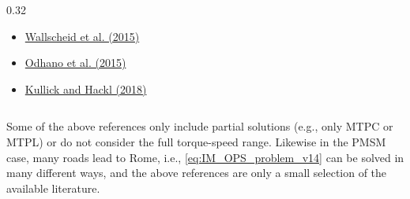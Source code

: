 \begin{frame}
\begin{columns}[T,onlytextwidth]
\begin{column}{0.32\textwidth}
            \begin{tcolorbox}[enhanced,arc=1mm,boxrule=0pt,frame hidden,drop fuzzy shadow=black!70,colback=gray!12,colbacktitle=defaultcolor,title={LUT},fonttitle=\normalsize,left=1mm,right=1mm,top=1mm,bottom=1mm]
                \footnotesize
                \begin{itemize}
                    \item \href{https://doi.org/10.1109/PEDS.2015.7203404}{Wallscheid et al. (2015)}
                    \item \href{https://doi.org/10.1109/TIA.2015.2448682}{Odhano et al. (2015)}
                    \item \href{https://arxiv.org/abs/1812.02431}{Kullick and Hackl (2018)}
                \end{itemize}
            \end{tcolorbox}
        \end{column}
    \end{columns}\pause%
    \vspace{5mm}
    \begin{tcolorbox}[enhanced,arc=1mm,boxrule=0pt,frame hidden,drop fuzzy shadow=black!70,colback=gray!12,colbacktitle=defaultcolor,title={Remark},fonttitle=\normalsize,left=1mm,right=1mm,top=1mm,bottom=1mm]
        Some of the above references only include partial solutions (e.g., only MTPC or MTPL) or do not consider the full torque-speed range. Likewise in the PMSM case, many roads lead to Rome, i.e., \eqref{eq:IM_OPS_problem_v14} can be solved in many different ways, and the above references are only a small selection of the available literature.
    \end{tcolorbox}
\end{frame}


